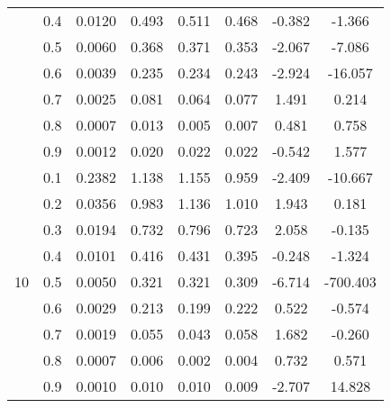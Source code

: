 \documentclass[11pt,a4paper]{report}
\begin{document}
\begin{longtable}{ | c | c || c | c | c | c | c | c | }
 & 0.4 & 0.0120 & 0.493 & 0.511 & 0.468 & -0.382 & -1.366 \\
 & 0.5 & 0.0060 & 0.368 & 0.371 & 0.353 & -2.067 & -7.086 \\
 & 0.6 & 0.0039 & 0.235 & 0.234 & 0.243 & -2.924 & -16.057 \\
 & 0.7 & 0.0025 & 0.081 & 0.064 & 0.077 & 1.491 & 0.214 \\
 & 0.8 & 0.0007 & 0.013 & 0.005 & 0.007 & 0.481 & 0.758 \\
 & 0.9 & 0.0012 & 0.020 & 0.022 & 0.022 & -0.542 & 1.577 \\
 \hline
\multirow{9}{*}{10} & 0.1 & 0.2382 & 1.138 & 1.155 & 0.959 & -2.409 & -10.667 \\
 & 0.2 & 0.0356 & 0.983 & 1.136 & 1.010 & 1.943 & 0.181 \\
 & 0.3 & 0.0194 & 0.732 & 0.796 & 0.723 & 2.058 & -0.135 \\
 & 0.4 & 0.0101 & 0.416 & 0.431 & 0.395 & -0.248 & -1.324 \\
 & 0.5 & 0.0050 & 0.321 & 0.321 & 0.309 & -6.714 & -700.403 \\
 & 0.6 & 0.0029 & 0.213 & 0.199 & 0.222 & 0.522 & -0.574 \\
 & 0.7 & 0.0019 & 0.055 & 0.043 & 0.058 & 1.682 & -0.260 \\
 & 0.8 & 0.0007 & 0.006 & 0.002 & 0.004 & 0.732 & 0.571 \\
 & 0.9 & 0.0010 & 0.010 & 0.010 & 0.009 & -2.707 & 14.828 \\
 \hline
\hline
\end{longtable}
\end{document}
